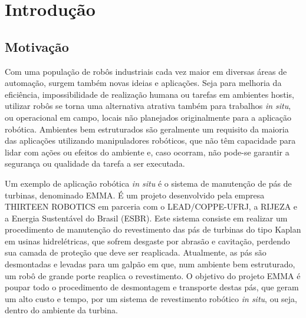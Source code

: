 \chapter{Introdução}

% 

\section{Motivação}

Com uma população de robôs industriais cada vez maior em diversas áreas de
automação, surgem também novas ideias e aplicações. Seja para melhoria da
eficiência, impossibilidade de realização humana ou tarefas em ambientes hostis,
utilizar robôs se torna uma alternativa atrativa também para trabalhos
\textit{in situ}, ou operacional em campo, locais não planejados originalmente
para a aplicação robótica.
Ambientes bem estruturados são geralmente um requisito da maioria das aplicações
utilizando manipuladores robóticos, que não têm capacidade para lidar com ações
ou efeitos do ambiente e, caso ocorram, não pode-se garantir a segurança ou
qualidade da tarefa a ser executada.

Um exemplo de aplicação robótica \textit{in situ} é o sistema de manutenção de
pás de turbinas, denominado EMMA\cite{freitas2017state}.
É um projeto desenvolvido pela empresa THIRTEEN ROBOTICS em parceria com o
LEAD/COPPE-UFRJ, a RIJEZA e a Energia Sustentável do Brasil (ESBR). Este sistema
consiste em realizar um procedimento de manutenção do revestimento das pás de
turbinas do tipo Kaplan em usinas hidrelétricas, que sofrem desgaste por abrasão
e cavitação, perdendo sua camada de proteção que deve ser reaplicada.
Atualmente, as pás são desmontadas e levadas para um galpão em que, num ambiente
bem estruturado, um robô de grande porte reaplica o revestimento.
O objetivo do projeto EMMA é poupar todo o procedimento de desmontagem e
transporte destas pás, que geram um alto custo e tempo, por um sistema de
revestimento robótico \textit{in situ}, ou seja, dentro do ambiente da turbina.

